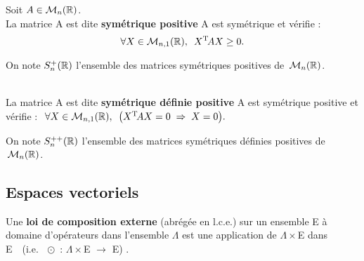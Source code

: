\vspace{1.6cm}

Soit \(A\in \mathcal{M}_n(\mathbb{R})\).\\
La matrice A est dite \textbf{symétrique positive} \ssi A est symétrique et vérifie :\vspace{-0.3cm} \[\forall X\in \mathcal{M}_{n,1}(\mathbb{R}),\ \, X^\text{T}\!AX\geq 0.\]
\vspace{-0.7cm}

\begin{small}
    On note \(S_n^+(\mathbb{R})\) l'ensemble des matrices symétriques positives de \(\,\mathcal{M}_n(\mathbb{R})\).
\end{small}\vspace{0.7cm}\\
La matrice A est dite \textbf{symétrique définie positive} \ssi A est symétrique positive et\vspace{0.1cm}\\
vérifie : \(\ \forall X\in\mathcal{M}_{n,1}(\mathbb{R}),\ \, \bigl( X^\text{T}\!AX=0 \; \Rightarrow \; X=0 \bigr).\)\vspace{0.2cm}

\begin{small}
    On note \(S_n^{++}(\mathbb{R})\) l'ensemble des matrices symétriques définies positives de \(\,\mathcal{M}_n(\mathbb{R})\).
\end{small}


\vspace{2.1cm}

\subsection{Espaces vectoriels}

\vspace{0.8cm}

Une \textbf{loi de composition externe} (abrégée en l.c.e.) sur un ensemble E à domaine d'opérateurs dans l'ensemble \(\Lambda\) est une application de \(\Lambda \times\)E dans E\ \ (i.e.\ \(\ \odot\) : \(\Lambda\times\)E \(\to\) E) .

\newpage

